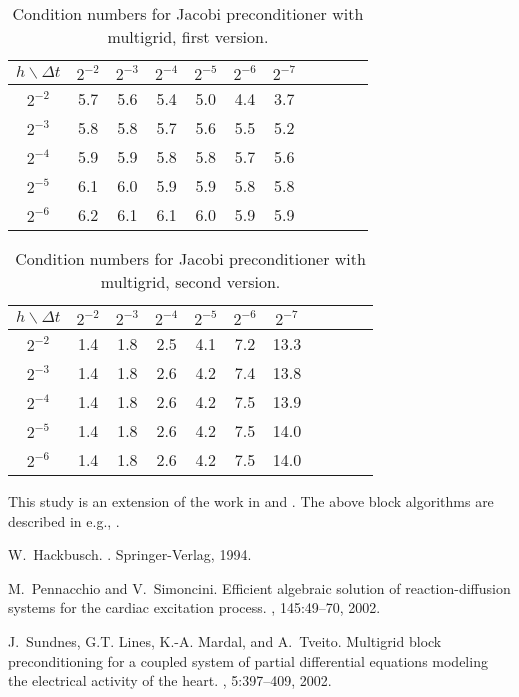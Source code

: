 \documentclass{report}
\begin{document}
\begin{table}[h]
\begin{center}
\begin{tabular}{|c||c|c|c|c|c|c|c|c|c|c|} \hline
$h\backslash \Delta t $ & $2^{-2}$ & $2^{-3}$ & $2^{-4}$ & $2^{-5}$ &
$2^{-6}$ & $2^{-7}$ \\ \hline
$2^{-2}$ & 5.7 & 5.6 & 5.4 & 5.0 & 4.4 & 3.7 \\
$2^{-3}$ & 5.8 & 5.8 & 5.7 & 5.6 & 5.5 & 5.2 \\
$2^{-4}$ & 5.9 & 5.9 & 5.8 & 5.8 & 5.7 & 5.6 \\
$2^{-5}$ & 6.1 & 6.0 & 5.9 & 5.9 & 5.8 & 5.8 \\
$2^{-6}$ & 6.2 & 6.1 & 6.1 & 6.0 & 5.9 & 5.9 \\
\hline
\end{tabular}
\end{center}
\caption{Condition numbers for Jacobi preconditioner with
multigrid, first version. }
\label{first:mg}
\end{table}

\begin{table}[h]
\begin{center}
\begin{tabular}{|c||c|c|c|c|c|c|c|c|c|c|} \hline
$h\backslash \Delta t $ & $2^{-2}$ & $2^{-3}$ & $2^{-4}$ & $2^{-5}$ &
$2^{-6}$ & $2^{-7}$ \\ \hline
$2^{-2}$ & 1.4 & 1.8 & 2.5 & 4.1 & 7.2 & 13.3 \\
$2^{-3}$ & 1.4 & 1.8 & 2.6 & 4.2 & 7.4 & 13.8 \\
$2^{-4}$ & 1.4 & 1.8 & 2.6 & 4.2 & 7.5 & 13.9 \\
$2^{-5}$ & 1.4 & 1.8 & 2.6 & 4.2 & 7.5 & 14.0 \\
$2^{-6}$ & 1.4 & 1.8 & 2.6 & 4.2 & 7.5 & 14.0 \\
\hline
\end{tabular}
\end{center}
\caption{Condition numbers for Jacobi preconditioner with
multigrid, second version. }
\label{second:mg}
\end{table}

This study is an extension of the work in \cite{Pennacchio} and \cite{block-mg}.
The above block algorithms are described in e.g., \cite{Hackbusch}.

\begin{thebibliography}{1}

W.~Hackbusch.
.
\newblock Springer-Verlag, 1994.

M.~Pennacchio and V.~Simoncini.
\newblock Efficient algebraic solution of reaction-diffusion systems for the
cardiac excitation process.
, 145:49--70,
2002.

J.~Sundnes, G.T. Lines, K.-A. Mardal, and A.~Tveito.
\newblock Multigrid block preconditioning for a coupled system of partial
differential equations modeling the electrical activity of the heart.
,
5:397--409, 2002.

\end{thebibliography}
\end{document}
